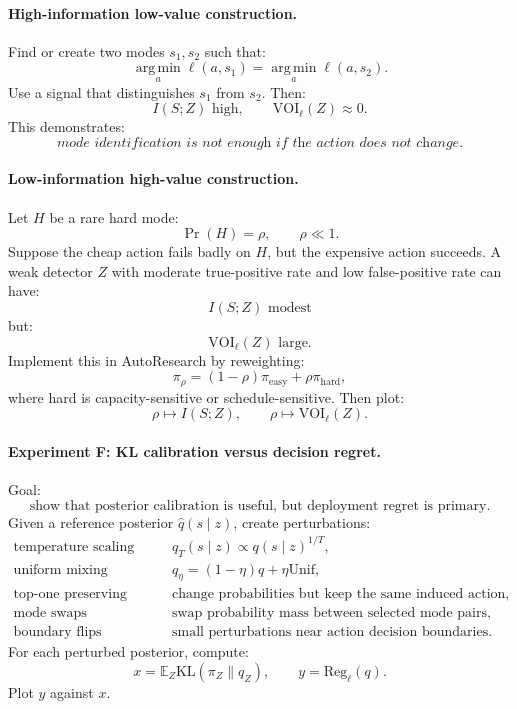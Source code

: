 \documentclass{article}
\providecommand{\KL}{\mathrm{KL}}
\providecommand{\argmin}{\operatorname*{arg\,min}}
\begin{document}
\paragraph{High-information low-value construction.}
Find or create two modes \(s_1,s_2\) such that:
\[
    \argmin_a\ell(a,s_1)=\argmin_a\ell(a,s_2).
\]
Use a signal that distinguishes \(s_1\) from \(s_2\).
Then:
\[
    I(S;Z)\text{ high},
    \qquad
    \mathrm{VOI}_\ell(Z)\approx 0.
\]
This demonstrates:
\[
    \textit{mode identification is not enough if the action does not change.}
\]

\paragraph{Low-information high-value construction.}
Let \(H\) be a rare hard mode:
\[
    \Pr(H)=\rho,\qquad \rho\ll 1.
\]
Suppose the cheap action fails badly on \(H\), but the expensive action succeeds.
A weak detector \(Z\) with moderate true-positive rate and low false-positive rate can have:
\[
    I(S;Z)\text{ modest}
\]
but:
\[
    \mathrm{VOI}_\ell(Z)\text{ large}.
\]
Implement this in AutoResearch by reweighting:
\[
    \pi_\rho=(1-\rho)\pi_{\mathrm{easy}}+\rho\pi_{\mathrm{hard}},
\]
where hard is capacity-sensitive or schedule-sensitive.
Then plot:
\[
    \rho\mapsto I(S;Z),
    \qquad
    \rho\mapsto \mathrm{VOI}_\ell(Z).
\]

\paragraph{Experiment F: KL calibration versus decision regret.}
Goal:
\[
    \text{show that posterior calibration is useful, but deployment regret is primary.}
\]
Given a reference posterior \(\hat q(s\mid z)\), create perturbations:
\[
\begin{array}{ll}
    \text{temperature scaling} &
    q_T(s\mid z)\propto q(s\mid z)^{1/T},\\
    \text{uniform mixing} &
    q_\eta=(1-\eta)q+\eta\mathrm{Unif},\\
    \text{top-one preserving noise} &
    \text{change probabilities but keep the same induced action},\\
    \text{mode swaps} &
    \text{swap probability mass between selected mode pairs},\\
    \text{boundary flips} &
    \text{small perturbations near action decision boundaries}.
\end{array}
\]
For each perturbed posterior, compute:
\[
    x=\mathbb E_Z\KL(\pi_Z\|q_Z),
    \qquad
    y=\mathrm{Reg}_{\ell}(q).
\]
Plot \(y\) against \(x\).
\end{document}
